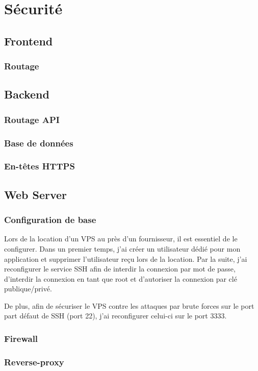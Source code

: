 \section{Sécurité}
\subsection{Frontend}
\subsubsection{Routage}
\subsection{Backend}
\subsubsection{Routage API}
\subsubsection{Base de données}
\subsubsection{En-têtes HTTPS}

\subsection{Web Server}
\subsubsection{Configuration de base}
Lors de la location d'un VPS au près d'un fournisseur, il est essentiel de le configurer. Dans un premier temps, j'ai créer un utilisateur dédié pour mon application et supprimer l'utilisateur reçu lors de la location.
Par la suite, j'ai reconfigurer le service SSH afin de interdir la connexion par mot de passe, d'interdir la connexion en tant que root et d'autoriser la connexion par clé publique/privé.

De plus, afin de sécuriser le VPS contre les attaques par brute forces sur le port part défaut de SSH (port 22), j'ai reconfigurer celui-ci sur le port 3333.


\subsubsection{Firewall}
\subsubsection{Reverse-proxy}

